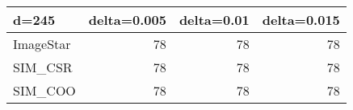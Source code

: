\begin{tabular}{lrrr}
\hline
 d=245     &   delta=0.005 &   delta=0.01 &   delta=0.015 \\
\hline
 ImageStar &            78 &           78 &            78 \\
 SIM\_CSR   &            78 &           78 &            78 \\
 SIM\_COO   &            78 &           78 &            78 \\
\hline
\end{tabular}
